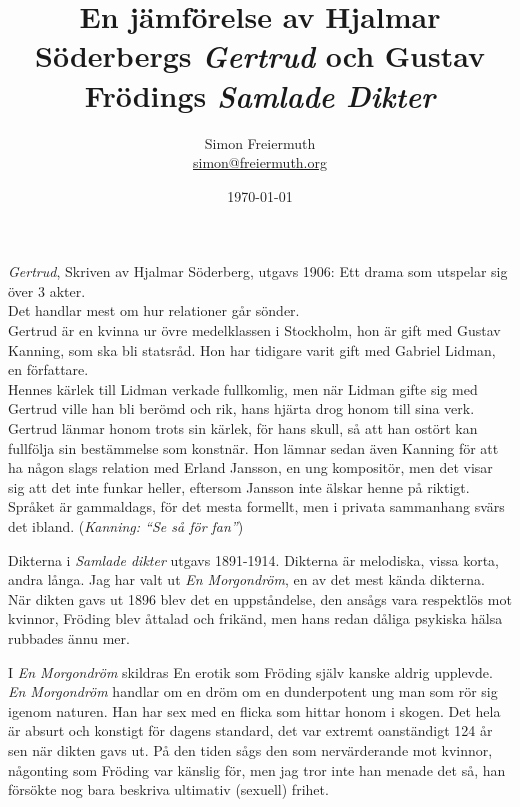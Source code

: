 \documentclass[12pt, letterpaper, twoside]{article}
\title{En jämförelse av Hjalmar Söderbergs \textit{Gertrud} och Gustav Frödings \textit{Samlade Dikter}}
\author{Simon Freiermuth \\ \href{mailto:simon@freiermuth.org}{simon@freiermuth.org}}
\date{\today}
\begin{document}
\maketitle


\textit{Gertrud}, Skriven av Hjalmar Söderberg, utgavs 1906:
Ett drama som utspelar sig över 3 akter.\\
Det handlar mest om hur relationer går sönder.\\
Gertrud är en kvinna ur övre medelklassen i Stockholm, hon är gift med Gustav Kanning,
som ska bli statsråd. Hon har tidigare varit gift med Gabriel Lidman,
en författare.\\
Hennes kärlek till Lidman verkade fullkomlig, men när Lidman gifte sig med Gertrud ville
han bli berömd och rik, hans hjärta drog honom till sina verk.
Gertrud länmar honom trots sin kärlek, för hans skull,
så att han ostört kan fullfölja sin bestämmelse som konstnär.
Hon lämnar sedan även Kanning för att ha någon slags relation med Erland Jansson,
en ung kompositör, men det visar sig att det inte funkar heller,
eftersom Jansson inte älskar henne på riktigt.\\

Språket är gammaldags, för det mesta formellt, men i privata sammanhang svärs det ibland.
(\textit{Kanning: ``Se så för fan''})

\hfill

Dikterna i \textit{Samlade dikter} utgavs 1891-1914.
Dikterna är melodiska, vissa korta, andra långa.
Jag har valt ut \textit{En Morgondröm}, en av det mest kända dikterna.\\
När dikten gavs ut 1896 blev det en uppståndelse, den ansågs vara respektlös mot kvinnor,
Fröding blev åttalad och frikänd, men hans redan dåliga psykiska hälsa rubbades ännu mer.

I \textit{En Morgondröm} skildras En erotik som Fröding själv kanske aldrig upplevde.\\
\textit{En Morgondröm} handlar om en dröm om en dunderpotent ung man som rör sig igenom naturen.
Han har sex med en flicka som hittar honom i skogen. Det hela är absurt och konstigt för dagens
standard, det var extremt oanständigt 124 år sen när dikten gavs ut.
På den tiden sågs den som nervärderande mot kvinnor, någonting som Fröding var känslig för, men jag
tror inte han menade det så, han försökte nog bara beskriva ultimativ (sexuell) frihet.\\
\end{document}
